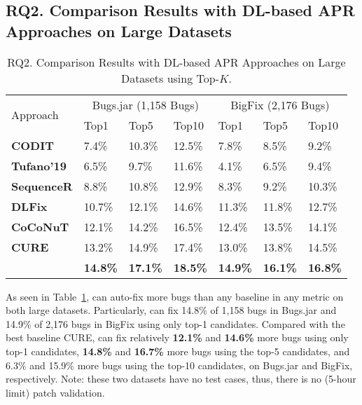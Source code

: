 \subsection{\bf RQ2. Comparison Results with DL-based APR Approaches on Large Datasets}

\begin{table}[t]
	\caption{RQ2. Comparison Results with DL-based APR Approaches on Large Datasets using Top-$K$.}
	\vspace{-10pt}
        {\small
	\begin{center}
		\renewcommand{\arraystretch}{1}
		\begin{tabular}{p{1.6cm}|p{0.7cm}|p{0.7cm}|p{0.7cm}|p{0.7cm}|p{0.7cm}|p{0.7cm}}\hline
			\multirow{2}{*}{Approach}&\multicolumn{3}{c|}{Bugs.jar (1,158 Bugs)}&\multicolumn{3}{c}{BigFix (2,176 Bugs)}\\\cline{2-7}
		                          & Top1   & Top5   & Top10  & Top1   & Top5   & Top10\\
			\hline
			\textbf{CODIT}        & 7.4\%  & 10.3\% & 12.5\% & 7.8\%  & 8.5\%  & 9.2\%\\
			\textbf{Tufano'19}  & 6.5\%  & 9.7\%  & 11.6\% & 4.1\%  & 6.5\%  & 9.4\%\\
			\textbf{SequenceR}    & 8.8\%  & 10.8\% & 12.9\% & 8.3\%  & 9.2\%  & 10.3\%\\
			\textbf{DLFix}        & 10.7\% & 12.1\% & 14.6\% & 11.3\% & 11.8\% & 12.7\%\\
			\textbf{CoCoNuT}      & 12.1\% & 14.2\% & 16.5\% & 12.4\% & 13.5\% & 14.1\%\\
			\textbf{CURE}         & 13.2\% & 14.9\% & 17.4\% & 13.0\% & 13.8\% & 14.5\%\\
			\hline
			\textbf{\tool}        & \textbf{14.8\%} & \textbf{17.1\%} & \textbf{18.5\%} & \textbf{14.9\%} & \textbf{16.1\%} & \textbf{16.8\%}\\
			\hline
		\end{tabular}
		\label{RQ2_results}
	\end{center}
        }
\end{table}


As seen in Table~\ref{RQ2_results}, {\tool} can auto-fix more bugs
than any baseline in any metric on both large datasets.  Particularly,
{\tool} can fix 14.8\% of 1,158 bugs in Bugs.jar and 14.9\% of 2,176
bugs in BigFix using only top-1 candidates. Compared with the
best baseline CURE, {\tool} can fix relatively {\bf 12.1\%}
and {\bf 14.6\%} more bugs using only top-1 candidates, {\bf 14.8\%}
and {\bf 16.7\%} more bugs using the top-5 candidates, and 6.3\% and
15.9\% more bugs using the top-10 candidates, on Bugs.jar and BigFix,
respectively. Note: these two datasets have no test
cases, thus, there is no (5-hour limit) patch validation.
